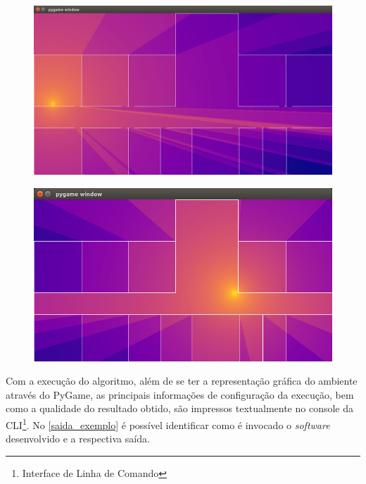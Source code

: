 \documentclass[
	12pt,				%
	twoside,			%
	a4paper,			%
	english,			%
	french,				%
	spanish,			%
	brazil				%
	]{abntex2}
\begin{document}
\begin{figure}[!htb]
\begin{minipage}{0.4\textwidth}
    \end{minipage}
    \hfill
    \begin{minipage}{0.4\textwidth}
        \centering \label{captura_3}
        \includegraphics[scale=0.188]{imagens/captura-3.jpg}
    \end{minipage}
    \hfill
    \begin{minipage}{0.4\textwidth}
        \centering \label{captura_4}
        \includegraphics[scale=0.28]{imagens/captura-4.jpg}
    \end{minipage}

\end{figure}

Com a execução do algoritmo, além de se ter a representação gráfica do
ambiente através do PyGame, as principais informações de configuração da
execução, bem como a qualidade do resultado obtido, são impressos
textualmente no console da CLI\footnote{Interface de Linha de Comando}.
No \autoref{saida_exemplo} é possível identificar como é invocado o
\emph{software} desenvolvido e a respectiva saída.
\end{document}
